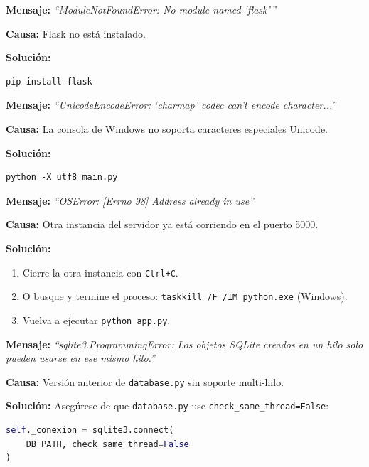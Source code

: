 \documentclass[12pt, a4paper]{article}
\begin{document}
\begin{errorbox}
\textbf{Mensaje:} \textit{``ModuleNotFoundError: No module named `flask'''}

\textbf{Causa:} Flask no est\'a instalado.

\textbf{Soluci\'on:}
\begin{lstlisting}
pip install flask
\end{lstlisting}
\end{errorbox}

\vspace{0.5cm}

\begin{errorbox}
\textbf{Mensaje:} \textit{``UnicodeEncodeError: `charmap' codec can't encode character...''}

\textbf{Causa:} La consola de Windows no soporta caracteres especiales Unicode.

\textbf{Soluci\'on:}
\begin{lstlisting}
python -X utf8 main.py
\end{lstlisting}
\end{errorbox}

\vspace{0.5cm}

\begin{errorbox}
\textbf{Mensaje:} \textit{``OSError: [Errno 98] Address already in use''}

\textbf{Causa:} Otra instancia del servidor ya est\'a corriendo en el puerto 5000.

\textbf{Soluci\'on:}
\begin{enumerate}
    \item Cierre la otra instancia con \texttt{Ctrl+C}.
    \item O busque y termine el proceso: \texttt{taskkill /F /IM python.exe} (Windows).
    \item Vuelva a ejecutar \texttt{python app.py}.
\end{enumerate}
\end{errorbox}

\vspace{0.5cm}

\begin{errorbox}
\textbf{Mensaje:} \textit{``sqlite3.ProgrammingError: Los objetos SQLite creados en un hilo solo pueden usarse en ese mismo hilo.''}

\textbf{Causa:} Versi\'on anterior de \texttt{database.py} sin soporte multi-hilo.

\textbf{Soluci\'on:} Aseg\'urese de que \texttt{database.py} use \texttt{check\_same\_thread=False}:
\begin{lstlisting}[language=Python]
self._conexion = sqlite3.connect(
    DB_PATH, check_same_thread=False
)
\end{lstlisting}
\end{errorbox}
\end{document}
